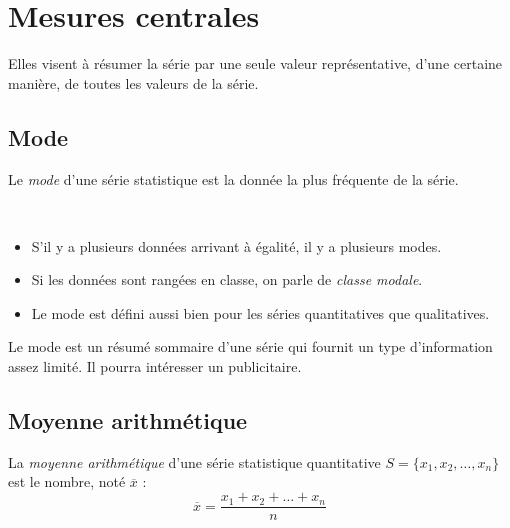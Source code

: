 

\section{Mesures centrales}

\begin{encadrer} \begin{Large}Elles visent \`a r\'esumer la s\'erie par une seule valeur repr\'esentative, d'une certaine mani\`ere, de toutes les valeurs de la s\'erie.                                                                                                                                                \end{Large}\end{encadrer}

\subsection{Mode}

\begin{definition}[Mode]
Le \emph{mode} d'une s\'erie statistique est la donn\'ee la plus fr\'equente de la s\'erie.
\end{definition}

\begin{rmqs}~
\begin{itemize}
	\item S'il y a plusieurs donn\'ees arrivant \`a \'egalit\'e, il y a plusieurs modes.
	\item Si les donn\'ees sont rang\'ees en classe, on parle de \emph{classe modale}.
	\item Le mode est d\'efini aussi bien pour les s\'eries quantitatives que qualitatives.
\end{itemize}
\end{rmqs}

Le mode est un r\'esum\'e sommaire d'une s\'erie qui fournit un type d'information assez limit\'e. Il pourra int\'eresser un publicitaire.

\subsection{Moyenne arithm\'etique}

\begin{definition}
La \emph{moyenne arithm\'etique} d'une s\'erie statistique quantitative $S=\{x_1,x_2,\ldots,x_n\}$ est le nombre,
not\'e $\overline{x}$ : \[\overline{x}=\frac{x_1+x_2+\ldots+x_n}{n}\]
\end{definition}


